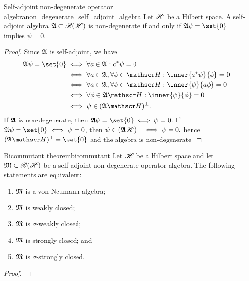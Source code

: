 \begin{lemma}{Self-adjoint non-degenerate operator algebra}{non_degenerate_self_adjoint_algebra}
    Let \(\mathscr{H}\) be a Hilbert space. A self-adjoint algebra \(\mathfrak{A} \subset \mathscr{B}(\mathscr{H})\) is non-degenerate if and only if \(\algebra{A}\psi = \set{0}\) implies \(\psi=0\).
\end{lemma}
\begin{proof}
    Since \(\mathfrak{A}\) is self-adjoint, we have
    \begin{align*}
        \algebra{A}\psi = \set{0} &\iff \forall a \in \algebra{A} : a^* \psi = 0\\
                                  &\iff \forall a \in \algebra{A}, \forall \phi \in \hilbert : \inner{a^*\psi}{\phi} = 0\\
                                  &\iff \forall a \in \algebra{A}, \forall \phi \in \hilbert : \inner{\psi}{a\phi} = 0\\
                                  &\iff \forall \phi \in \algebra{A}\hilbert : \inner{\psi}{\phi} = 0\\
                                  &\iff \psi \in (\algebra{A}\hilbert)^{\perp}.
    \end{align*}
    If \(\mathfrak{A}\) is non-degenerate, then \(\algebra{A}\psi = \set{0} \iff \psi = 0\). If \(\algebra{A} \psi = \set{0} \iff \psi = 0\), then \(\psi \in (\mathfrak{A}\mathscr{H})^{\perp} \iff \psi = 0,\) hence \((\algebra{A}\hilbert)^{\perp} = \set{0}\) and the algebra is non-degenerate.
\end{proof}

\begin{theorem}{Bicommutant theorem}{bicommutant}
    Let \(\mathscr{H}\) be a Hilbert space and let \(\mathfrak{M} \subset \mathscr{B}(\mathscr{H})\) be a self-adjoint non-degenerate operator algebra. The following statements are equivalent:
    \begin{enumerate}[label=(\alph*)]
        \item \(\mathfrak{M}\) is a von Neumann algebra;
        \item \(\mathfrak{M}\) is weakly closed;
        \item \(\mathfrak{M}\) is \(\sigma\)-weakly closed;
        \item \(\mathfrak{M}\) is strongly closed; and
        \item \(\mathfrak{M}\) is \(\sigma\)-strongly closed.
    \end{enumerate}
\end{theorem}
\begin{proof}
    \todo[lots]
\end{proof}
